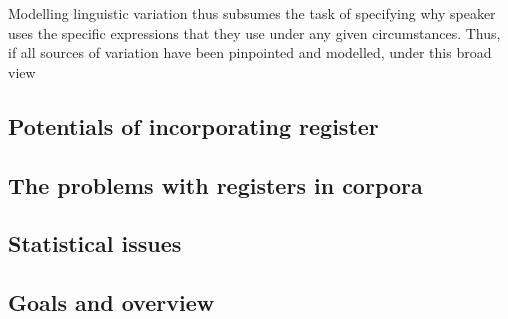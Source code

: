 Modelling linguistic variation thus subsumes the task of specifying why speaker uses the specific expressions that they use under any given circumstances.
Thus, if all sources of variation have been pinpointed and modelled,  under this broad view


\subsection{Potentials of incorporating register}



\subsection{The problems with registers in corpora}



\subsection{Statistical issues}



\subsection{Goals and overview}






\newpage
